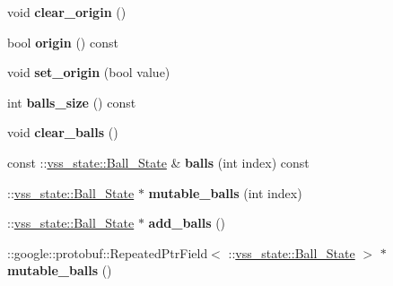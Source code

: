 \begin{DoxyCompactItemize}
\item 
void {\bfseries clear\+\_\+origin} ()\hypertarget{classvss__state_1_1Global__State_a60aa49b36faa6533ed70bc9e01208282}{}\label{classvss__state_1_1Global__State_a60aa49b36faa6533ed70bc9e01208282}

\item 
bool {\bfseries origin} () const \hypertarget{classvss__state_1_1Global__State_a5b09a31922fe8f976a7e21f2279a1364}{}\label{classvss__state_1_1Global__State_a5b09a31922fe8f976a7e21f2279a1364}

\item 
void {\bfseries set\+\_\+origin} (bool value)\hypertarget{classvss__state_1_1Global__State_ac88223b795690cc57a71f24b315352fc}{}\label{classvss__state_1_1Global__State_ac88223b795690cc57a71f24b315352fc}

\item 
int {\bfseries balls\+\_\+size} () const \hypertarget{classvss__state_1_1Global__State_a5010e0f86563f07ce75ed2138de96ae5}{}\label{classvss__state_1_1Global__State_a5010e0f86563f07ce75ed2138de96ae5}

\item 
void {\bfseries clear\+\_\+balls} ()\hypertarget{classvss__state_1_1Global__State_a738a0947e2c3a450614579e1b7c008e4}{}\label{classvss__state_1_1Global__State_a738a0947e2c3a450614579e1b7c008e4}

\item 
const \+::\hyperlink{classvss__state_1_1Ball__State}{vss\+\_\+state\+::\+Ball\+\_\+\+State} \& {\bfseries balls} (int index) const \hypertarget{classvss__state_1_1Global__State_a6177a6bdab45c96d10c9f64371cd12af}{}\label{classvss__state_1_1Global__State_a6177a6bdab45c96d10c9f64371cd12af}

\item 
\+::\hyperlink{classvss__state_1_1Ball__State}{vss\+\_\+state\+::\+Ball\+\_\+\+State} $\ast$ {\bfseries mutable\+\_\+balls} (int index)\hypertarget{classvss__state_1_1Global__State_a88e1c23a1561e6edeaa2c835ad5eb358}{}\label{classvss__state_1_1Global__State_a88e1c23a1561e6edeaa2c835ad5eb358}

\item 
\+::\hyperlink{classvss__state_1_1Ball__State}{vss\+\_\+state\+::\+Ball\+\_\+\+State} $\ast$ {\bfseries add\+\_\+balls} ()\hypertarget{classvss__state_1_1Global__State_aa02eca734a92c0f8352fc57dbda91e4e}{}\label{classvss__state_1_1Global__State_aa02eca734a92c0f8352fc57dbda91e4e}

\item 
\+::google\+::protobuf\+::\+Repeated\+Ptr\+Field$<$ \+::\hyperlink{classvss__state_1_1Ball__State}{vss\+\_\+state\+::\+Ball\+\_\+\+State} $>$ $\ast$ {\bfseries mutable\+\_\+balls} ()\hypertarget{classvss__state_1_1Global__State_a47fa3f079e92555b8d86ef916def763e}{}\label{classvss__state_1_1Global__State_a47fa3f079e92555b8d86ef916def763e}


\end{DoxyCompactItemize}
